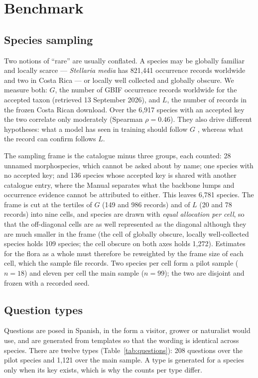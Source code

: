 \documentclass[11pt,a4paper]{article}
\begin{document}
\section{Benchmark}\label{sec:benchmark}

\subsection{Species sampling}\label{sec:sampling}
Two notions of ``rare'' are usually conflated. A species may be globally familiar and
locally scarce --- \emph{Stellaria media} has 821{,}441 occurrence records worldwide
and two in Costa Rica --- or locally well collected and globally obscure. We measure
both: $G$, the number of GBIF occurrence records worldwide for the accepted taxon
(retrieved 13 September 2026), and $L$, the number of records in the frozen Costa
Rican download. Over the 6{,}917 species with an accepted key the two correlate only
moderately (Spearman $\rho = 0.46$). They also drive different hypotheses: what a
model has seen in training should follow $G$ \citep{kandpal2023longtail}, whereas
what the record can confirm follows $L$.

The sampling frame is the catalogue minus three groups, each counted: 28 unnamed
morphospecies, which cannot be asked about by name; one species with no accepted key;
and 136 species whose accepted key is shared with another catalogue entry, where the
Manual separates what the backbone lumps and occurrence evidence cannot be attributed
to either. This leaves 6{,}781 species. The frame is cut at the tertiles of $G$ (149
and 986 records) and of $L$ (20 and 78 records) into nine cells, and species are
drawn with \emph{equal allocation per cell}, so that the off-diagonal cells are as
well represented as the diagonal although they are much smaller in the frame (the
cell of globally obscure, locally well-collected species holds 109 species; the cell
obscure on both axes holds 1{,}272). Estimates for the flora as a whole must
therefore be reweighted by the frame size of each cell, which the sample file
records. Two species per cell form a pilot sample ($n = 18$) and eleven per cell the
main sample ($n = 99$); the two are disjoint and frozen with a recorded seed.

\subsection{Question types}
Questions are posed in Spanish, in the form a visitor, grower or naturalist would
use, and are generated from templates so that the wording is identical across
species. There are twelve types (Table~\ref{tab:questions}): 208 questions over the
pilot species and 1{,}121 over the main sample. A type is generated for a species
only when its key exists, which is why the counts per type differ.
\end{document}
